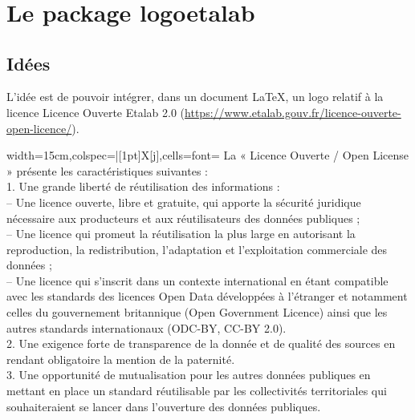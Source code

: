 \documentclass[french,11pt,a4paper]{article}
\begin{document}
\hfill
{\LARGE\loetalab~\loetalab[Couleur=Bleu]~\loetalab[Couleur=Gris]~\loetalab[Couleur=Marron]~\loetalab[Couleur=Rouge]~\loetalab[Couleur=Vert]~\loetalab[Couleur=Violet]}
\hfill~

\vspace*{1cm}

\hfill
{\LARGE\loetalab*~\loetalab*[Couleur=Bleu]~\loetalab*[Couleur=Gris]~\loetalab*[Couleur=Marron]~\loetalab*[Couleur=Rouge]~\loetalab*[Couleur=Vert]~\loetalab*[Couleur=Violet]}
\hfill~

\vfill~

\pagebreak

\section{Le package logoetalab}

\subsection{Idées}

L'idée est de pouvoir intégrer, dans un document \LaTeX, un logo relatif à la licence \og Licence Ouverte Etalab 2.0 \fg{} (\url{https://www.etalab.gouv.fr/licence-ouverte-open-licence/}).

\medskip

\hfill
\begin{tblr}{width=15cm,colspec={|[1pt]X[j]},cells={font=\footnotesize}}
	La « Licence Ouverte / Open License » présente les caractéristiques suivantes :\\
	1. Une grande liberté de réutilisation des informations :\\
	-- Une licence ouverte, libre et gratuite, qui apporte la sécurité juridique nécessaire aux producteurs et aux réutilisateurs des données publiques ;\\
	-- Une licence qui promeut la réutilisation la plus large en autorisant la reproduction, la redistribution, l’adaptation et l’exploitation commerciale des données ;\\
	-- Une licence qui s’inscrit dans un contexte international en étant compatible avec les standards des licences Open Data développées à l’étranger et notamment celles du gouvernement britannique (Open Government Licence) ainsi que les autres standards internationaux (ODC-BY, CC-BY 2.0).\\
	2. Une exigence forte de transparence de la donnée et de qualité des sources en rendant obligatoire la mention de la paternité.\\
	3. Une opportunité de mutualisation pour les autres données publiques en mettant en place un standard réutilisable par les collectivités territoriales qui souhaiteraient se lancer dans l’ouverture des données publiques.\\
\end{tblr}
\hfill~
\end{document}
